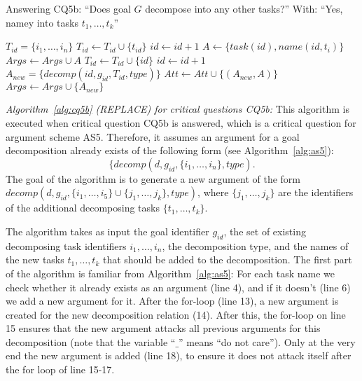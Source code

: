 \begin{algorithm}[h]
  \caption{Answering CQ5b: ``Does goal $G$ decompose into any other tasks?'' With: ``Yes, namey into tasks $t_1,\ldots,t_k$''}\label{alg:cq5b}
  \begin{algorithmic}[1]
    \State $T_{id} = \{i_1,\ldots,i_n\}$
    \label{alg:cq5b:for1}
        \State $T_{id} \gets T_{id} \cup \{t_{id}\}$
      \Else
        \State $id\gets id+1$
        \State $A \gets \{task(id),name(id,t_i)\}$
        \State $Args \gets Args\cup A$
        \State $T_{id} \gets T_{id} \cup \{id\}$
      \EndIf
    \EndFor
    \State $id\gets id+1$
    \State $A_{new} = \{decomp(id, g_{id}, T_{id}, type)\}$\label{alg:cq5b:newarg}
    \label{alg:cq5b:for2}
      \State $Att\gets Att \cup \{(A_{new},A)\}$
    \EndFor
    \State $Args \gets Args \cup \{A_{new}\}$
    \EndProcedure
  \end{algorithmic}
\end{algorithm}

\emph{Algorithm~\ref{alg:cq5b} (\textsf{REPLACE}) for critical questions CQ5b:} This algorithm is executed when critical question CQ5b is answered, which is a critical question for argument scheme AS5. Therefore, it assumes an argument for a goal decomposition already exists of the following form (see Algorithm~\ref{alg:as5}): $$\{decomp(d, g_{id}, \{i_1,\ldots,i_n\},type).$$  The goal of the algorithm is to generate a new argument of the form $decomp(d, g_{id}, \{i_1,\ldots,i_5\}\cup \{j_1,\ldots,j_k\}, type)$, where $\{j_1,\ldots,j_k\}$ are the identifiers of the additional decomposing tasks $\{t_1,\ldots,t_k\}$.

The algorithm takes as input the goal identifier $g_{id}$, the set of existing decomposing task identifiers $i_1,\ldots,i_n$, the decomposition type, and the names of the new tasks $t_1,\ldots,t_k$ that should be added to the decomposition. The first part of the algorithm is familiar from Algorithm~\ref{alg:as5}: For each task name we check whether it already exists as an argument (line 4), and if it doesn't (line 6) we add a new argument for it. After the for-loop (line 13), a new argument is created for the new decomposition relation (14). After this, the for-loop on line 15 ensures that the new argument attacks all previous arguments for this decomposition (note that the variable ``$\_$'' means ``do not care''). Only at the very end the new argument is added (line 18), to ensure it does not attack itself after the for loop of line 15-17. 

